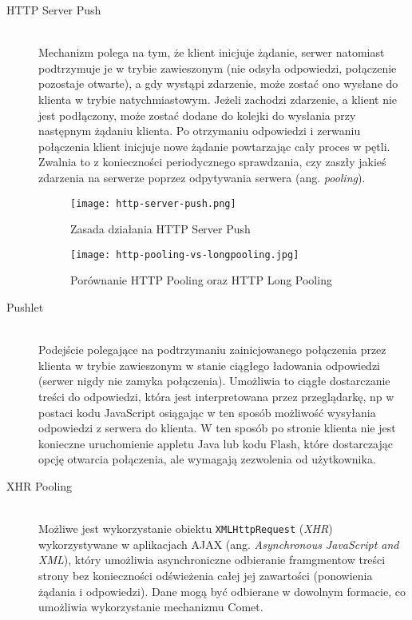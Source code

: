\begin{description}
  \item[HTTP Server Push] \hfill \\
  Mechanizm polega na tym, że klient inicjuje żądanie, serwer natomiast podtrzymuje je w trybie zawieszonym (nie odsyła odpowiedzi, połączenie pozostaje otwarte), a gdy wystąpi zdarzenie, może zostać ono wysłane do klienta w trybie natychmiastowym. Jeżeli zachodzi zdarzenie, a klient nie jest podłączony, może zostać dodane do kolejki do wysłania przy następnym żądaniu klienta. Po otrzymaniu odpowiedzi i zerwaniu połączenia klient inicjuje nowe żądanie powtarzając cały proces w pętli. Zwalnia to z konieczności periodycznego sprawdzania, czy zaszły jakieś zdarzenia na serwerze poprzez odpytywania serwera (ang. \emph{pooling}).

  \begin{figure}[H]
    \caption[Zasada działania HTTP Server Push]{Zasada działania HTTP Server Push}
    \centering
      \texttt{[image: http-server-push.png]}
  \end{figure}

  \begin{figure}[H]
    \caption[Porównanie HTTP Pooling oraz HTTP Long Pooling]{Porównanie HTTP Pooling oraz HTTP Long Pooling}
    \centering
      \texttt{[image: http-pooling-vs-longpooling.jpg]}
  \end{figure}

  \item[Pushlet] \hfill \\
  Podejście polegające na podtrzymaniu zainicjowanego połączenia przez klienta w trybie zawieszonym w stanie ciągłego ładowania odpowiedzi (serwer nigdy nie zamyka połączenia). Umożliwia to ciągłe dostarczanie treści do odpowiedzi, która jest interpretowana przez przeglądarkę, np w postaci kodu JavaScript osiągając w ten sposób możliwość wysyłania odpowiedzi z serwera do klienta. W ten sposób po stronie klienta nie jest konieczne uruchomienie appletu Java lub kodu Flash, które dostarczając opcję otwarcia połączenia, ale wymagają zezwolenia od użytkownika.

  \item[XHR Pooling] \hfill \\
  Możliwe jest wykorzystanie obiektu \lstinline{XMLHttpRequest} (\emph{XHR})\cite{xhr-rfc} wykorzystywane w aplikacjach AJAX (ang. \emph{Asynchronous JavaScript and XML}), który umożliwia asynchroniczne odbieranie framgmentow treści strony bez konieczności odświeżenia całej jej zawartości (ponowienia żądania i odpowiedzi). Dane mogą być odbierane w dowolnym formacie, co umożliwia wykorzystanie mechanizmu Comet.\\


\end{description}
